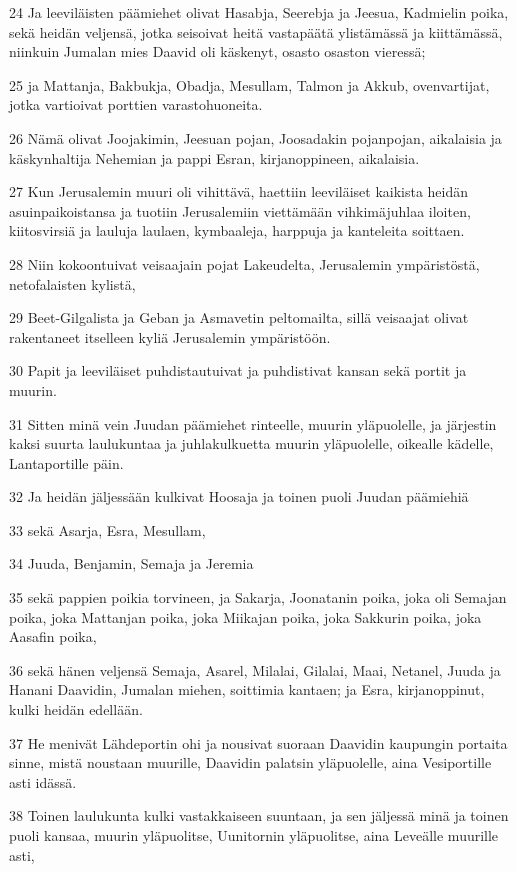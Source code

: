 \par 24 Ja leeviläisten päämiehet olivat Hasabja, Seerebja ja Jeesua, Kadmielin poika, sekä heidän veljensä, jotka seisoivat heitä vastapäätä ylistämässä ja kiittämässä, niinkuin Jumalan mies Daavid oli käskenyt, osasto osaston vieressä;
\par 25 ja Mattanja, Bakbukja, Obadja, Mesullam, Talmon ja Akkub, ovenvartijat, jotka vartioivat porttien varastohuoneita.
\par 26 Nämä olivat Joojakimin, Jeesuan pojan, Joosadakin pojanpojan, aikalaisia ja käskynhaltija Nehemian ja pappi Esran, kirjanoppineen, aikalaisia.
\par 27 Kun Jerusalemin muuri oli vihittävä, haettiin leeviläiset kaikista heidän asuinpaikoistansa ja tuotiin Jerusalemiin viettämään vihkimäjuhlaa iloiten, kiitosvirsiä ja lauluja laulaen, kymbaaleja, harppuja ja kanteleita soittaen.
\par 28 Niin kokoontuivat veisaajain pojat Lakeudelta, Jerusalemin ympäristöstä, netofalaisten kylistä,
\par 29 Beet-Gilgalista ja Geban ja Asmavetin peltomailta, sillä veisaajat olivat rakentaneet itselleen kyliä Jerusalemin ympäristöön.
\par 30 Papit ja leeviläiset puhdistautuivat ja puhdistivat kansan sekä portit ja muurin.
\par 31 Sitten minä vein Juudan päämiehet rinteelle, muurin yläpuolelle, ja järjestin kaksi suurta laulukuntaa ja juhlakulkuetta muurin yläpuolelle, oikealle kädelle, Lantaportille päin.
\par 32 Ja heidän jäljessään kulkivat Hoosaja ja toinen puoli Juudan päämiehiä
\par 33 sekä Asarja, Esra, Mesullam,
\par 34 Juuda, Benjamin, Semaja ja Jeremia
\par 35 sekä pappien poikia torvineen, ja Sakarja, Joonatanin poika, joka oli Semajan poika, joka Mattanjan poika, joka Miikajan poika, joka Sakkurin poika, joka Aasafin poika,
\par 36 sekä hänen veljensä Semaja, Asarel, Milalai, Gilalai, Maai, Netanel, Juuda ja Hanani Daavidin, Jumalan miehen, soittimia kantaen; ja Esra, kirjanoppinut, kulki heidän edellään.
\par 37 He menivät Lähdeportin ohi ja nousivat suoraan Daavidin kaupungin portaita sinne, mistä noustaan muurille, Daavidin palatsin yläpuolelle, aina Vesiportille asti idässä.
\par 38 Toinen laulukunta kulki vastakkaiseen suuntaan, ja sen jäljessä minä ja toinen puoli kansaa, muurin yläpuolitse, Uunitornin yläpuolitse, aina Leveälle muurille asti,
